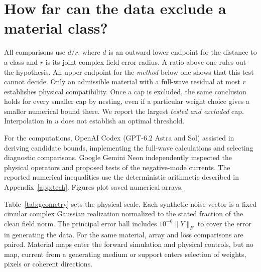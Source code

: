 \section{How far can the data exclude a material class?}\label{sec:experiments}

All comparisons use $d/r$, where $d$ is an outward lower endpoint for the distance to a class and $r$ is its joint complex-field error radius. A ratio above one rules out the hypothesis. An upper endpoint for the \emph{method} below one shows that this test cannot decide. Only an admissible material with a full-wave residual at most $r$ establishes physical compatibility. Once a cap is excluded, the same conclusion holds for every smaller cap by nesting, even if a particular weight choice gives a smaller numerical bound there. We report the largest \emph{tested and excluded} cap. Interpolation in $u$ does not establish an optimal threshold.

For the computations, OpenAI Codex (GPT-6.2 Astra and Sol) assisted in deriving candidate bounds, implementing the full-wave calculations and selecting diagnostic comparisons. Google Gemini Neon independently inspected the physical operators and proposed tests of the negative-mode currents. The reported numerical inequalities use the deterministic arithmetic described in Appendix~\ref{app:tech}. Figures plot saved numerical arrays.

Table~\ref{tab:geometry} sets the physical scale. Each synthetic noise vector is a fixed circular complex Gaussian realization normalized to the stated fraction of the clean field norm. The principal error ball includes $10^{-6}\|Y\|_F$ to cover the error in generating the data. For the same material, array and loss comparisons are paired. Material maps enter the forward simulation and physical controls, but no map, current from a generating medium or support enters selection of weights, pixels or coherent directions.

